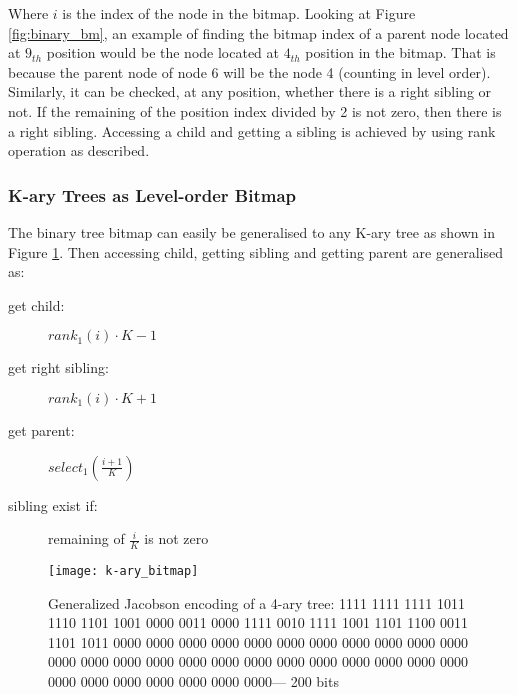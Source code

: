 Where \(i\) is the index of the node in the bitmap. Looking at Figure \ref{fig:binary_bm}, an example of finding the bitmap index of a parent node located at $9_{th}$ position would be the node located at $4_{th}$ position in the bitmap. That is because the parent node of  node 6 will be the node 4 (counting in level order). Similarly, it can be checked, at any position, whether there is a right sibling or not. If the remaining of the position index divided by 2 is not zero, then there is a right sibling. Accessing a child and getting a sibling is achieved by using rank operation as described.

\subsubsection*{K-ary Trees as Level-order Bitmap}
The binary tree bitmap can easily be generalised to any K-ary tree as shown in Figure \ref{fig:k-ary-bm}. Then accessing child, getting sibling and getting parent are generalised as:

\begin{description}
	\item [get child: ] \(rank_1(i) \cdot K - 1\)
	\item [get right sibling: ] \(rank_1(i) \cdot K + 1\)
	\item [get parent: ] \(select_1(\frac{i + 1}{K} )\)
	\item [sibling exist if: ] remaining of \(\frac{i}{K}\) is not zero
\end{description}

\begin{figure}
	 \centering
    \texttt{[image: k-ary\_bitmap]}
    \caption{Generalized Jacobson encoding of a 4-ary tree: 1111 1111 1111 1011 1110 1101 1001 0000 0011 0000 1111 0010 1111 1001 1101 1100 0011 1101 1011 0000 0000 0000 0000 0000 0000 0000 0000 0000 0000 0000 0000 0000 0000 0000 0000 0000 0000 0000 0000 0000 0000 0000 0000 0000 0000 0000 0000 0000 0000 0000--- 200 bits}
    \label{fig:k-ary-bm}
\end{figure}

